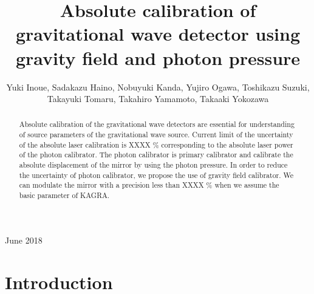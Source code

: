 \documentclass[12pt]{iopart}
\begin{document}
\title[]{Absolute calibration of gravitational wave detector using gravity field and photon pressure}

\author{Yuki Inoue, Sadakazu Haino, Nobuyuki Kanda, Yujiro Ogawa, Toshikazu Suzuki, Takayuki Tomaru, Takahiro Yamamoto, Takaaki Yokozawa}
\address{Institute of Physics, Academia Sinica, Nankang, Taipei 11529, Taiwan}
\address{ Institute for Cosmic Ray Research, University of Tokyo, Kashiwa, Chiba, 277-8582, Japan}
 \address{Department of Physics, Osaka City University, Sumiyoshi, Osaka 558-8585, Japan}
 \address{KAGRA Observatory, Institute for Cosmic Ray Research, University of Tokyo, Hida, Gifu 506-1205, Japan}
 \address{High Energy Accelerator Research Organization, Tsukuba, Ibaraki, 305-0801, Japan}

\vspace{10pt}
\begin{indented}
\item[]June 2018
\end{indented}

\begin{abstract}
Absolute calibration of the gravitational wave detectors are essential for understanding of source parameters of the gravitational wave source. Current limit of the uncertainty of the absolute laser calibration is XXXX \% corresponding to the absolute laser power of the photon calibrator. The photon calibrator is primary calibrator and calibrate the absolute displacement of the mirror by using the photon pressure. In order to reduce the uncertainty of photon calibrator, we propose the use of gravity field calibrator. We can modulate the mirror with a precision less than XXXX \% when we assume the basic parameter of KAGRA.
\end{abstract}

%
%
%
% 
%



\section{Introduction}
\end{document}
